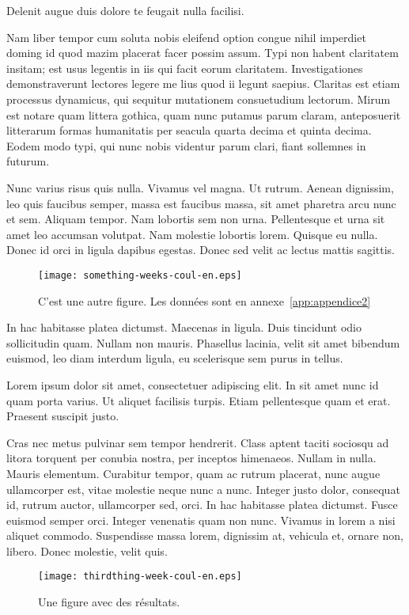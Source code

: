 \begin{contenu}

Delenit augue duis dolore te feugait nulla facilisi.

Nam liber tempor cum soluta nobis eleifend option congue nihil imperdiet doming
id quod mazim placerat facer possim assum. Typi non habent claritatem insitam;
est usus legentis in iis qui facit eorum claritatem. Investigationes
demonstraverunt lectores legere me lius quod ii legunt saepius. Claritas est
etiam processus dynamicus, qui sequitur mutationem consuetudium lectorum. Mirum
est notare quam littera gothica, quam nunc putamus parum claram, anteposuerit
litterarum formas humanitatis per seacula quarta decima et quinta decima. Eodem
modo typi, qui nunc nobis videntur parum clari, fiant sollemnes in futurum.

Nunc varius risus quis nulla. Vivamus vel magna. Ut rutrum. Aenean dignissim,
leo quis faucibus semper, massa est faucibus massa, sit amet pharetra arcu nunc
et sem. Aliquam tempor. Nam lobortis sem non urna. Pellentesque et urna sit amet
leo accumsan volutpat. Nam molestie lobortis lorem. Quisque eu nulla. Donec id
orci in ligula dapibus egestas. Donec sed velit ac lectus mattis sagittis.

\begin{figure}[!ht]
\centering
\texttt{[image: something-weeks-coul-en.eps]}
\caption[Figure machintruc]{C'est une autre figure. Les données sont en annexe~\ref{app:appendice2}} 
\label{fig-blabla}
\end{figure}


In hac habitasse platea dictumst. Maecenas in ligula. Duis tincidunt odio
sollicitudin quam. Nullam non mauris. Phasellus lacinia, velit sit amet bibendum
euismod, leo diam interdum ligula, eu scelerisque sem purus in tellus.

Lorem ipsum dolor sit amet, consectetuer adipiscing elit. In sit amet nunc id
quam porta varius. Ut aliquet facilisis turpis. Etiam pellentesque quam et erat.
Praesent suscipit justo.

Cras nec metus pulvinar sem tempor hendrerit. Class aptent taciti sociosqu ad
litora torquent per conubia nostra, per inceptos himenaeos. Nullam in nulla.
Mauris elementum. Curabitur tempor, quam ac rutrum placerat, nunc augue
ullamcorper est, vitae molestie neque nunc a nunc. Integer justo dolor,
consequat id, rutrum auctor, ullamcorper sed, orci. In hac habitasse platea
dictumst. Fusce euismod semper orci. Integer venenatis quam non nunc. Vivamus in
lorem a nisi aliquet commodo. Suspendisse massa lorem, dignissim at, vehicula
et, ornare non, libero. Donec molestie, velit quis.

\begin{figure}[!ht]
\centering
\texttt{[image: thirdthing-week-coul-en.eps]}
\caption[Des résultats]{Une figure avec des résultats.} 
\label{fig-figure3}
\end{figure}

\end{contenu}

